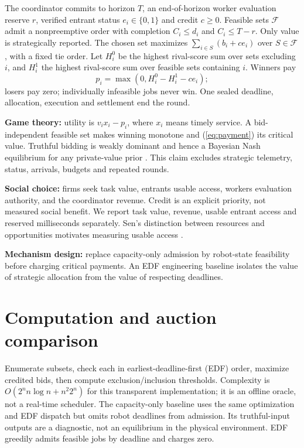The coordinator commits to horizon $T$, an end-of-horizon worker evaluation reserve $r$, verified entrant status $e_i\in\{0,1\}$ and credit $c\geq0$. Feasible sets $\mathcal F$ admit a nonpreemptive order with completion $C_i\leq d_i$ and $C_i\leq T-r$. Only value is strategically reported. The chosen set maximizes $\sum_{i\in S}(b_i+ce_i)$ over $S\in\mathcal F$, with a fixed tie order. Let $H_i^0$ be the highest rival-score sum over sets excluding $i$, and $H_i^1$ the highest rival-score sum over feasible sets containing $i$. Winners pay
\begin{equation}\label{eq:payment}
p_i=\max(0,H_i^0-H_i^1-ce_i);
\end{equation}
losers pay zero; individually infeasible jobs never win. One sealed deadline, allocation, execution and settlement end the round.

\textbf{Game theory:} utility is $v_ix_i-p_i$, where $x_i$ means timely service. A bid-independent feasible set makes winning monotone and (\ref{eq:payment}) its critical value. Truthful bidding is weakly dominant and hence a Bayesian Nash equilibrium for any private-value prior \cite{harsanyi,roughgarden}. This claim excludes strategic telemetry, status, arrivals, budgets and repeated rounds.

\textbf{Social choice:} firms seek task value, entrants usable access, workers evaluation authority, and the coordinator revenue. Credit is an explicit priority, not measured social benefit. We report task value, revenue, usable entrant access and reserved milliseconds separately. Sen's distinction between resources and opportunities motivates measuring usable access \cite{sen}.

\textbf{Mechanism design:} replace capacity-only admission by robot-state feasibility before charging critical payments. An EDF engineering baseline isolates the value of strategic allocation from the value of respecting deadlines.

\section{Computation and auction comparison}
Enumerate subsets, check each in earliest-deadline-first (EDF) order, maximize credited bids, then compute exclusion/inclusion thresholds. Complexity is $O(2^n n\log n+n^2 2^n)$ for this transparent implementation; it is an offline oracle, not a real-time scheduler. The capacity-only baseline uses the same optimization and EDF dispatch but omits robot deadlines from admission. Its truthful-input outputs are a diagnostic, not an equilibrium in the physical environment. EDF greedily admits feasible jobs by deadline and charges zero.

